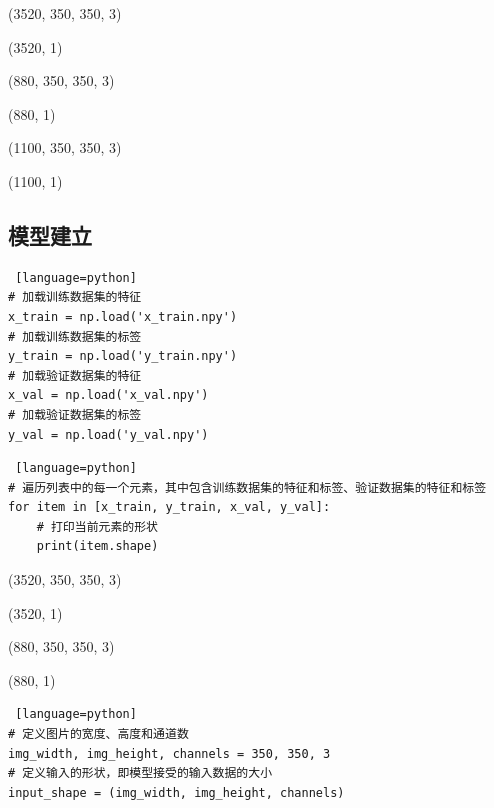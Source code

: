 \documentclass{article}
\begin{document}
(3520, 350, 350, 3)\par
(3520, 1)\par
(880, 350, 350, 3)\par
(880, 1)\par
(1100, 350, 350, 3)\par
(1100, 1)
\subsection{模型建立}
\begin{lstlisting} [language=python]
# 加载训练数据集的特征  
x_train = np.load('x_train.npy')  
# 加载训练数据集的标签  
y_train = np.load('y_train.npy')  
# 加载验证数据集的特征  
x_val = np.load('x_val.npy')  
# 加载验证数据集的标签  
y_val = np.load('y_val.npy')
\end{lstlisting}
\begin{lstlisting} [language=python]
# 遍历列表中的每一个元素，其中包含训练数据集的特征和标签、验证数据集的特征和标签  
for item in [x_train, y_train, x_val, y_val]:  
    # 打印当前元素的形状  
    print(item.shape)
\end{lstlisting}

(3520, 350, 350, 3)\par
(3520, 1)\par
(880, 350, 350, 3)\par
(880, 1)
\begin{lstlisting} [language=python]
# 定义图片的宽度、高度和通道数  
img_width, img_height, channels = 350, 350, 3  
# 定义输入的形状，即模型接受的输入数据的大小  
input_shape = (img_width, img_height, channels)
\end{lstlisting}
\end{document}
